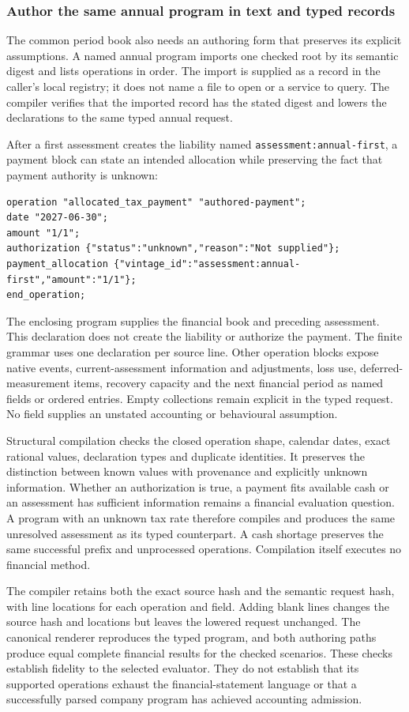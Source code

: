 
\subsubsection*{Author the same annual program in text and typed records}
The common period book also needs an authoring form that preserves its explicit
assumptions. A named annual program imports one checked root by its semantic
digest and lists operations in order. The import is supplied as a record in
the caller's local registry; it does not name a file to open or a service to
query. The compiler verifies that the imported record has the stated digest
and lowers the declarations to the same typed annual request.

After a first assessment creates the liability named
\texttt{assessment:annual-first}, a payment block can state an intended
allocation while preserving the fact that payment authority is unknown:
\begin{verbatim}
operation "allocated_tax_payment" "authored-payment";
date "2027-06-30";
amount "1/1";
authorization {"status":"unknown","reason":"Not supplied"};
payment_allocation {"vintage_id":"assessment:annual-first","amount":"1/1"};
end_operation;
\end{verbatim}
The enclosing program supplies the financial book and preceding assessment.
This declaration does not create the liability or authorize the payment. The
finite grammar uses one declaration per source line. Other
operation blocks expose native events, current-assessment information
and adjustments, loss use, deferred-measurement items, recovery capacity and
the next financial period as named fields or ordered entries. Empty
collections remain explicit in the typed request. No field supplies an
unstated accounting or behavioural assumption.

Structural compilation checks the closed operation shape, calendar dates,
exact rational values, declaration types and duplicate identities. It preserves
the distinction between known values with provenance and explicitly unknown
information. Whether an authorization is true, a payment fits available cash
or an assessment has sufficient information remains a financial evaluation
question. A program with an unknown tax rate therefore compiles and produces
the same unresolved assessment as its typed counterpart. A cash shortage
preserves the same successful prefix and unprocessed operations. Compilation
itself executes no financial method.

The compiler retains both the exact source hash and the semantic request hash,
with line locations for each operation and field. Adding blank lines changes
the source hash and locations but leaves the lowered request unchanged. The
canonical renderer reproduces the typed program, and both authoring paths
produce equal complete financial results for the checked scenarios. These
checks establish fidelity to the selected evaluator. They do not establish
that its supported operations exhaust the financial-statement language or
that a successfully parsed company program has achieved accounting admission.
